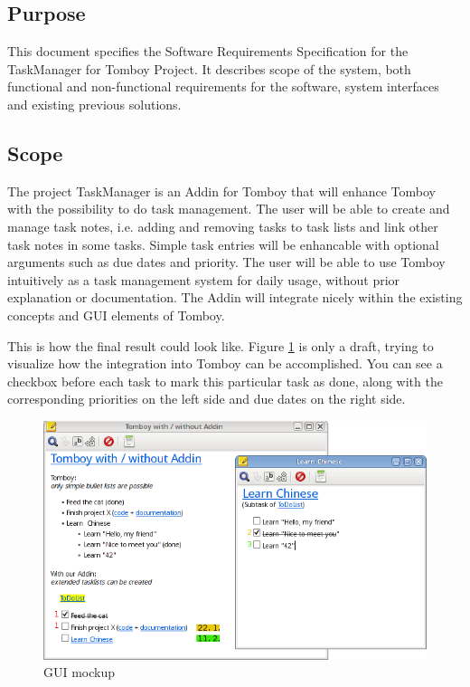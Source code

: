 \subsection{Purpose}
\label{intro:purpose}
This document specifies the Software Requirements Specification for the TaskManager for Tomboy Project.
It describes scope of the system, both functional and non-functional requirements for the software, system interfaces and existing previous solutions.


\subsection{Scope}
\label{intro:scope}
The project TaskManager is an Addin for Tomboy that will enhance Tomboy with the possibility to do task management. 
The user will be able to create and manage task notes, i.e. adding and removing tasks to task lists and link other task notes in some tasks.
Simple task entries will be enhancable with optional arguments such as due dates and priority.
The user will be able to use Tomboy intuitively as a task management system for daily usage, without prior explanation or documentation. 
The Addin will integrate nicely within the existing concepts and GUI elements of Tomboy.

This is how the final result could look like. Figure \ref{gui} is only a draft, trying to visualize how the integration into Tomboy can be accomplished. You can see a checkbox before each task to mark this particular task as done, along with the corresponding priorities on the left side and due dates on the right side.
\begin{figure}[h]
  \includegraphics[width=\textwidth]{graphics/Screenshot_cropped_edited.png}
  \caption{GUI mockup}
  \label{gui}
\end{figure}


